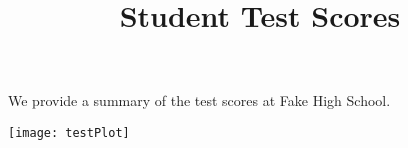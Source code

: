 \documentclass{article}
\title{Student Test Scores}
\begin{document}
	
	\maketitle

	We provide a summary of the test scores at Fake High School. 

	

	\texttt{[image: testPlot]}
\end{document}

